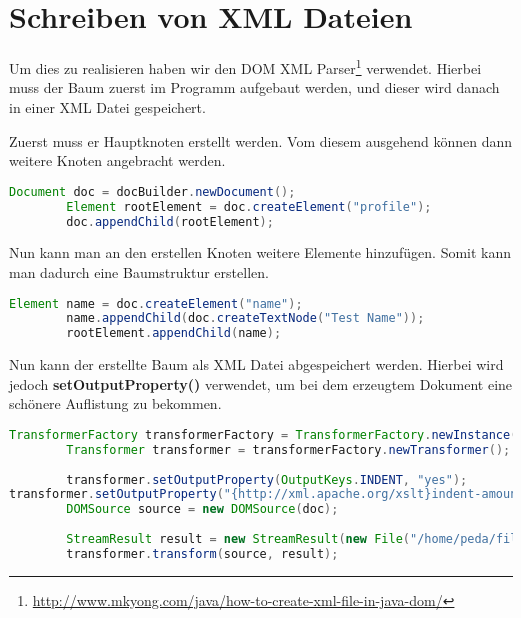 \section{Schreiben von XML Dateien}
Um dies zu realisieren haben wir den DOM XML Parser\footnote{\url{http://www.mkyong.com/java/how-to-create-xml-file-in-java-dom/}} verwendet. Hierbei muss der Baum zuerst im Programm aufgebaut werden, und dieser wird danach in einer XML Datei gespeichert.

Zuerst muss er Hauptknoten erstellt werden. Vom diesem ausgehend können dann weitere Knoten angebracht werden.
\begin{lstlisting}[language=JAVA]
		Document doc = docBuilder.newDocument();
		Element rootElement = doc.createElement("profile");
		doc.appendChild(rootElement);
\end{lstlisting}

Nun kann man an den erstellen Knoten weitere Elemente hinzufügen. Somit kann man dadurch eine Baumstruktur erstellen.
\begin{lstlisting}[language=JAVA]
Element name = doc.createElement("name");
		name.appendChild(doc.createTextNode("Test Name"));
		rootElement.appendChild(name);
\end{lstlisting}

Nun kann der erstellte Baum als XML Datei abgespeichert werden. Hierbei wird jedoch \textbf{setOutputProperty()} verwendet, um bei dem erzeugtem Dokument eine schönere Auflistung zu bekommen.
\begin{lstlisting}[language=JAVA]
TransformerFactory transformerFactory = TransformerFactory.newInstance();
		Transformer transformer = transformerFactory.newTransformer();
		
		transformer.setOutputProperty(OutputKeys.INDENT, "yes");
transformer.setOutputProperty("{http://xml.apache.org/xslt}indent-amount", "2");
		DOMSource source = new DOMSource(doc);
		
		StreamResult result = new StreamResult(new File("/home/peda/file.xml"));
		transformer.transform(source, result);
\end{lstlisting}